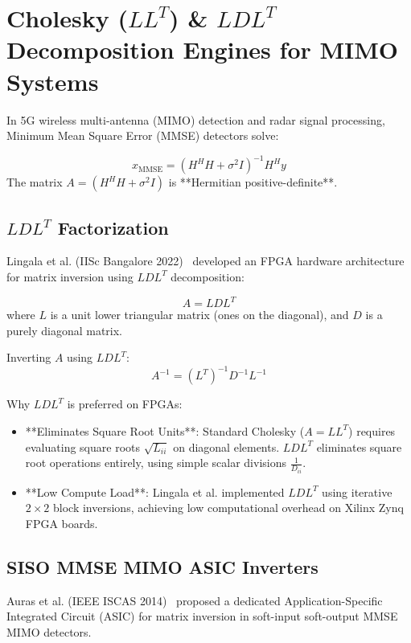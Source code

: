 \section{Cholesky ($L L^T$) \& $L D L^T$ Decomposition Engines for MIMO Systems}
In 5G wireless multi-antenna (MIMO) detection and radar signal processing, Minimum Mean Square Error (MMSE) detectors solve:

\begin{equation}
x_{\text{MMSE}} = (H^H H + \sigma^2 I)^{-1} H^H y
\end{equation}
The matrix $A = (H^H H + \sigma^2 I)$ is **Hermitian positive-definite**.

\subsection{$L D L^T$ Factorization}
Lingala et al. (IISc Bangalore 2022)~\cite{lingala2022matrix} developed an FPGA hardware architecture for matrix inversion using $L D L^T$ decomposition:

\begin{equation}
A = L D L^T
\end{equation}
where $L$ is a unit lower triangular matrix (ones on the diagonal), and $D$ is a purely diagonal matrix.

Inverting $A$ using $L D L^T$:
\begin{equation}
A^{-1} = (L^T)^{-1} D^{-1} L^{-1}
\end{equation}

Why $L D L^T$ is preferred on FPGAs:
\begin{itemize}[leftmargin=*]
    \item **Eliminates Square Root Units**: Standard Cholesky ($A = L L^T$) requires evaluating square roots $\sqrt{L_{ii}}$ on diagonal elements. $L D L^T$ eliminates square root operations entirely, using simple scalar divisions $\frac{1}{D_{ii}}$.
    \item **Low Compute Load**: Lingala et al. implemented $L D L^T$ using iterative $2 \times 2$ block inversions, achieving low computational overhead on Xilinx Zynq FPGA boards.
\end{itemize}

\subsection{SISO MMSE MIMO ASIC Inverters}
Auras et al. (IEEE ISCAS 2014)~\cite{auras2014efficient} proposed a dedicated Application-Specific Integrated Circuit (ASIC) for matrix inversion in soft-input soft-output MMSE MIMO detectors. 


